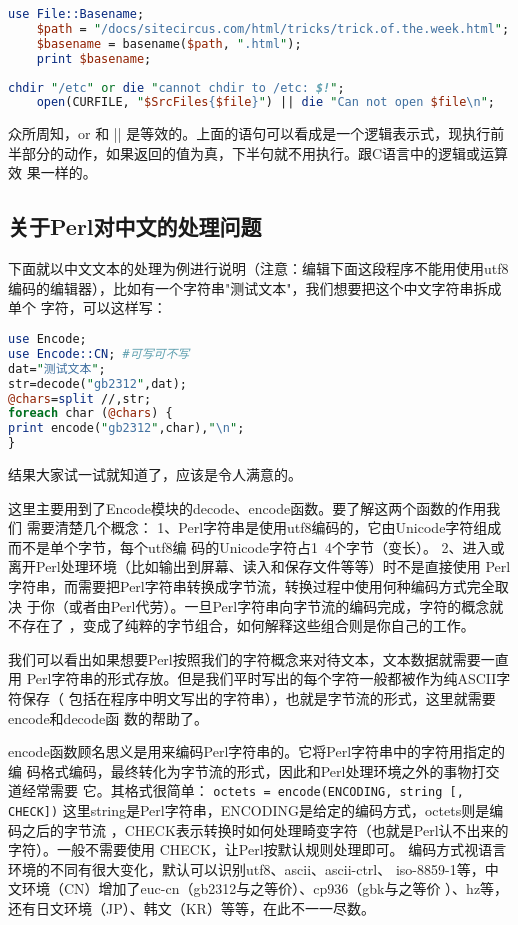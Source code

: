 \documentclass[a4paper,11pt]{book}
\begin{document}
\begin{lstlisting}[language=perl, caption=从一个文件的完全路径中找出它的名字]
    use File::Basename;
    $path = "/docs/sitecircus.com/html/tricks/trick.of.the.week.html";
    $basename = basename($path, ".html");
    print $basename;
\end{lstlisting}

\begin{lstlisting}[language=perl]
    chdir "/etc" or die "cannot chdir to /etc: $!";
    open(CURFILE, "$SrcFiles{$file}") || die "Can not open $file\n";
\end{lstlisting}
众所周知，or 和 || 是等效的。上面的语句可以看成是一个逻辑表示式，现执行前
半部分的动作，如果返回的值为真，下半句就不用执行。跟C语言中的逻辑或运算效
果一样的。 

\subsection{关于Perl对中文的处理问题} 
下面就以中文文本的处理为例进行说明（注意：编辑下面这段程序不能用使用utf8
编码的编辑器），比如有一个字符串"测试文本"，我们想要把这个中文字符串拆成单个
字符，可以这样写：
\begin{lstlisting}[language=perl]
use Encode;
use Encode::CN; #可写可不写
dat="测试文本";
str=decode("gb2312",dat);
@chars=split //,str;
foreach char (@chars) {
print encode("gb2312",char),"\n";
}
\end{lstlisting}
结果大家试一试就知道了，应该是令人满意的。

这里主要用到了Encode模块的decode、encode函数。要了解这两个函数的作用我们
需要清楚几个概念：
1、Perl字符串是使用utf8编码的，它由Unicode字符组成而不是单个字节，每个utf8编
码的Unicode字符占1~4个字节（变长）。
2、进入或离开Perl处理环境（比如输出到屏幕、读入和保存文件等等）时不是直接使用
Perl字符串，而需要把Perl字符串转换成字节流，转换过程中使用何种编码方式完全取决
于你（或者由Perl代劳）。一旦Perl字符串向字节流的编码完成，字符的概念就不存在了
，变成了纯粹的字节组合，如何解释这些组合则是你自己的工作。

我们可以看出如果想要Perl按照我们的字符概念来对待文本，文本数据就需要一直用
Perl字符串的形式存放。但是我们平时写出的每个字符一般都被作为纯ASCII字符保存（
包括在程序中明文写出的字符串），也就是字节流的形式，这里就需要encode和decode函
数的帮助了。

encode函数顾名思义是用来编码Perl字符串的。它将Perl字符串中的字符用指定的编
码格式编码，最终转化为字节流的形式，因此和Perl处理环境之外的事物打交道经常需要
它。其格式很简单：
\lstinline{octets = encode(ENCODING, string [, CHECK])}
这里string是Perl字符串，ENCODING是给定的编码方式，octets则是编码之后的字节流
，CHECK表示转换时如何处理畸变字符（也就是Perl认不出来的字符）。一般不需要使用
CHECK，让Perl按默认规则处理即可。
编码方式视语言环境的不同有很大变化，默认可以识别utf8、ascii、ascii-ctrl、
iso-8859-1等，中文环境（CN）增加了euc-cn（gb2312与之等价）、cp936（gbk与之等价
）、hz等，还有日文环境（JP）、韩文（KR）等等，在此不一一尽数。
\end{document}
